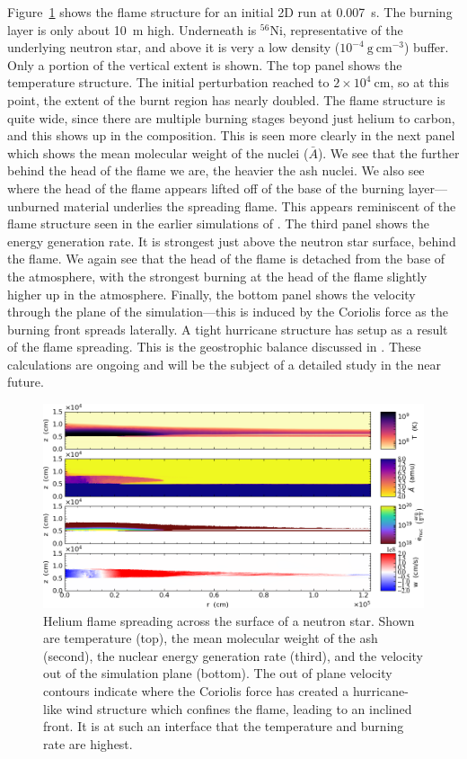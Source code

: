 \documentclass[a4paper]{jpconf}
\newcommand{\isot}[2]{$^{#2}\mathrm{#1}$}
\newcommand{\gcc}{\mathrm{g~cm^{-3} }}
\newcommand{\MarginPar}[1]{\marginpar{\vskip-\baselineskip\raggedright\tiny\sffamily\hrule\smallskip{\color{red}#1}\par\smallskip\hrule}}
\begin{document}
Figure~\ref{fig:xrb} shows the flame structure for an initial 2D run
at 0.007~s.  The burning layer is only about 10~m high.  Underneath is
\isot{Ni}{56}, representative of the underlying neutron star, and
above it is very a low density ($10^{-4}~\gcc$) buffer.  Only a
portion of the vertical extent is shown.  The top panel shows the
temperature structure.  The initial perturbation reached to $2\times
10^4~\mathrm{cm}$, so at this point, the extent of the burnt region
has nearly doubled.  The flame structure is quite wide, since there
are multiple burning stages beyond just helium to carbon, and this
shows up in the composition.  This is seen more clearly in the next
panel which shows the mean molecular weight of the nuclei ($\bar{A}$).
We see that the further behind the head of the flame we are, the heavier
the ash nuclei.  We also see where the head of the flame
appears lifted off of the base of the burning layer---unburned
material underlies the spreading flame.  This appears
reminiscent of the flame structure seen in the earlier simulations of
\cite{cavecchi:2012}. \MarginPar{Yuri, would you agree?} The third panel shows the energy generation rate.
It is strongest just above the neutron star surface, behind the flame.
We again see that the head of the flame is detached from the base
of the atmosphere, with the strongest burning at the head of the flame
slightly higher up in the atmosphere.   Finally, the bottom
panel shows the velocity through the plane of the simulation---this is
induced by the Coriolis force as the burning front spreads laterally.
A tight hurricane structure has setup as a result of the flame
spreading.  This is the geostrophic balance discussed in
\cite{SPIT_ETAL02}.    These calculations are ongoing and will be
the subject of a detailed study in the near future.

\begin{figure}
\centering
\includegraphics[width=0.95\linewidth]{xrb}
\caption{\label{fig:xrb} Helium flame spreading across the surface of
  a neutron star.  Shown are temperature (top), the mean molecular
  weight of the ash (second), the nuclear energy generation rate
  (third), and the velocity out of the simulation plane (bottom).  The
  out of plane velocity contours indicate where the Coriolis force has
  created a hurricane-like wind structure which confines the flame,
  leading to an inclined front. It is at such an interface that the
  temperature and burning rate are highest.  }
\end{figure}
\end{document}
